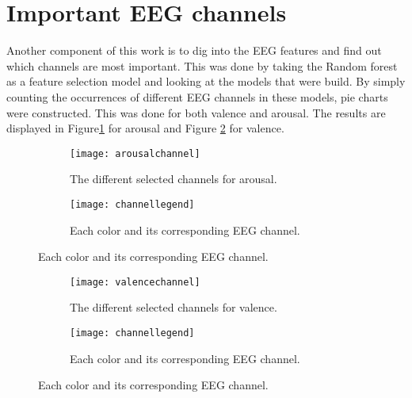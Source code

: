 \section{Important EEG channels}

Another component of this work is to dig into the EEG features and find out which channels are most important. This was done by taking the Random forest as a feature selection model and looking at the models that were build. By simply counting the occurrences of different EEG channels in these models, pie charts were constructed. This was done for both valence and arousal. The results are displayed in Figure\ref{arousalchannel} for arousal and Figure \ref{valencechannel} for valence.

\begin{figure}[H]
\centering

  \begin{subfigure}[b]{.5\textwidth}
    \texttt{[image: arousalchannel]}
    \caption{The different selected channels for arousal.\label{arousalchannel}}
  \end{subfigure}
\hfill
  \begin{subfigure}[b]{.4\textwidth}
    \texttt{[image: channellegend]}
    \caption{Each color and its corresponding EEG channel.}
  \end{subfigure}
\end{figure}

\begin{figure}[H]
\centering
  \begin{subfigure}[b]{.5\textwidth}
    \texttt{[image: valencechannel]}
    \caption{The different selected channels for valence.\label{valencechannel}}
  \end{subfigure}
\hfill
  \begin{subfigure}[b]{.4\textwidth}
    \texttt{[image: channellegend]}
    \caption{Each color and its corresponding EEG channel.}
  \end{subfigure}
\end{figure}

